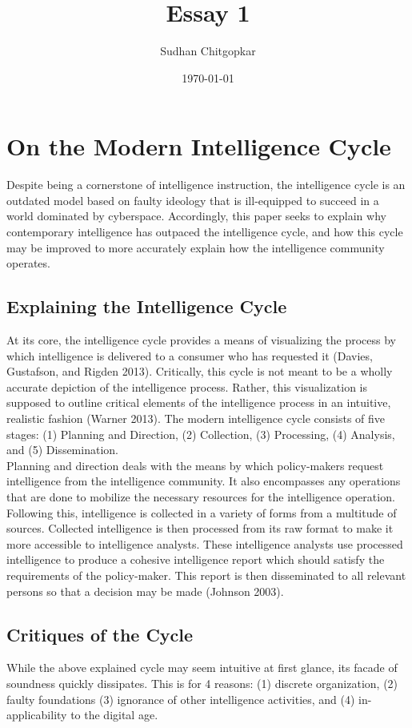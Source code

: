 \documentclass[10pt, letterpaper]{article}
\title{Essay 1}
\author{Sudhan Chitgopkar}
\date{\today}
\begin{document}
\newpage
\tableofcontents
{}
\listoffigures
\newpage
\doublespacing
\section{On the Modern Intelligence Cycle}
Despite being a cornerstone of intelligence instruction, the intelligence cycle is an outdated model based on faulty ideology that is ill-equipped to succeed in a world dominated by cyberspace. Accordingly, this paper seeks to explain why contemporary intelligence has outpaced the intelligence cycle, and how this cycle may be improved to more accurately explain how the intelligence community operates.
\subsection{Explaining the Intelligence Cycle}
At its core, the intelligence cycle provides a means of visualizing the process by which intelligence is delivered to a consumer who has requested it (Davies, Gustafson, and Rigden 2013). Critically, this cycle is not meant to be a wholly accurate depiction of the intelligence process. Rather, this visualization is supposed to outline critical elements of the intelligence process in an intuitive, realistic fashion (Warner 2013). The modern intelligence cycle consists of five stages: (1) Planning and Direction, (2) Collection, (3) Processing, (4) Analysis, and (5) Dissemination. \\

Planning and direction deals with the means by which policy-makers request intelligence from the intelligence community. It also encompasses any operations that are done to mobilize the necessary resources for the intelligence operation. Following this, intelligence is collected in a variety of forms from a multitude of sources. Collected intelligence is then processed from its raw format to make it more accessible to intelligence analysts. These intelligence analysts use processed intelligence to produce a cohesive intelligence report which should satisfy the requirements of the policy-maker. This report is then disseminated to all relevant persons so that a decision may be made (Johnson 2003).

\subsection{Critiques of the Cycle}
While the above explained cycle may seem intuitive at first glance, its facade of soundness quickly dissipates. This is for 4 reasons: (1) discrete organization, (2) faulty foundations (3) ignorance of other intelligence activities, and (4) in-applicability to the digital age. \\
\end{document}
